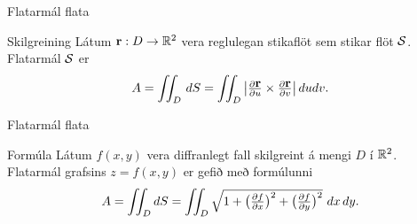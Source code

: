 \begin{frame}{Flatarmál flata} 

\begin {block}{Skilgreining  \rtask{}}
  Látum $\mbox{${\bf r}$}:D\rightarrow {\mathbb R}^2$ vera
reglulegan stikaflöt sem stikar flöt $\cal S$.  Flatarmál $\cal S$ er  
$$ A=\int\!\!\!\int_D\,dS=\int\!\!\!\int_D \big|{\textstyle\frac{\partial \mbox{${\bf r}$}}{\partial u}
\times\frac{\partial \mbox{${\bf r}$}}{\partial v}}\big|\,dudv.$$
\end{block}

\end{frame}


\begin{frame}{Flatarmál flata} 

\begin {block}{Formúla  \rtask{}}
Látum $f(x,y)$ vera diffranlegt fall skilgreint á
mengi $D$ í ${\mathbb R}^2$.  Flatarmál grafsins $z=f(x,y)$ er gefið með
formúlunni 
$$A=\int\!\!\!\int_D dS=\int\!\!\!\int_D {\textstyle\sqrt{1+
\big(\frac{\partial f}{\partial x}\big)^2+
\big(\frac{\partial f}{\partial y}\big)^2}}\,\,dx\,dy.$$
   
\end{block}

\end{frame}

